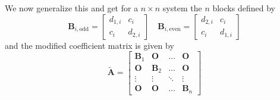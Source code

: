\documentclass{article}
\begin{document}
We now generalize this and get for a $n \times n$ system the $n$ blocks defined by 
\begin{equation*}
    \mathbf{B}_{i, \text{odd}} = \begin{bmatrix}
        d_{1, i} & c_{i} \\
        c_{i} & d_{2,i}
    \end{bmatrix} \quad
    \mathbf{B}_{i, \text{even}} = \begin{bmatrix}
        d_{2, i} & c_{i} \\
        c_{i} & d_{1,i}
    \end{bmatrix}
\end{equation*}
and the modified coefficient matrix is given by
\begin{equation*}
    \tilde{\mathbf{A}} = \begin{bmatrix}
        \mathbf{B}_{1} & \mathbf{O} & \dots & \mathbf{O} \\
        \mathbf{O} & \mathbf{B}_{2} & \dots & \mathbf{O} \\
        \vdots & \vdots &\ddots & \vdots \\
        \mathbf{O} & \mathbf{O} & \dots & \mathbf{B}_{n}
    \end{bmatrix}
\end{equation*}

\pagebreak 
\end{document}

